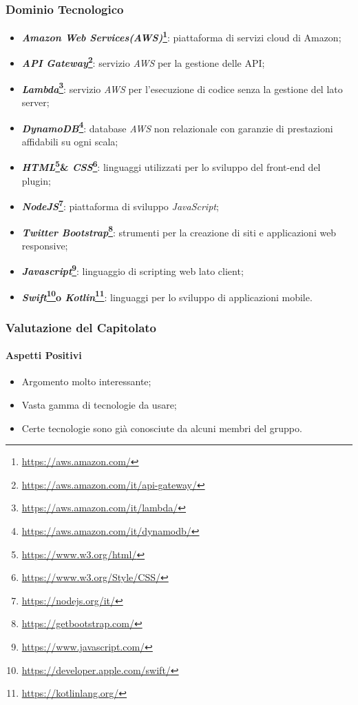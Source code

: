 \subsubsection{Dominio Tecnologico}
\begin{itemize}
	\item \textbf{\textit{Amazon Web Services(AWS)}\footnote{\url{https://aws.amazon.com/}}\glossario}: piattaforma di servizi cloud di Amazon;
	\item \textbf{\textit{API Gateway}\footnote{\url{https://aws.amazon.com/it/api-gateway/}}\glossario}: servizio \textit{AWS} per la gestione delle API;
	\item \textbf{\textit{Lambda}\footnote{\url{https://aws.amazon.com/it/lambda/}}\glossario}: servizio \textit{AWS} per l’esecuzione di codice senza la gestione del lato server;
	\item \textbf{\textit{DynamoDB}\footnote{\url{https://aws.amazon.com/it/dynamodb/}}\glossario}: database \textit{AWS} non relazionale con garanzie di prestazioni affidabili su ogni scala;
	\item \textbf{\textit{HTML}\footnote{\url{https://www.w3.org/html/}}\glossario \& \textit{CSS}\footnote{\url{https://www.w3.org/Style/CSS/}}\glossario}: linguaggi utilizzati per lo sviluppo del front-end del plugin;
	\item \textbf{\textit{NodeJS}\footnote{\url{https://nodejs.org/it/}}\glossario}: piattaforma di sviluppo \textit{JavaScript};
	\item \textbf{\textit{Twitter Bootstrap}\footnote{\url{https://getbootstrap.com/}}\glossario}: strumenti per la creazione di siti e applicazioni web responsive;
	\item \textbf{\textit{Javascript}\footnote{\url{https://www.javascript.com/}}}: linguaggio di scripting web lato client;
	\item \textbf{\textit{Swift}\footnote{\url{https://developer.apple.com/swift/}}\glossario o \textit{Kotlin}\footnote{\url{https://kotlinlang.org/}}\glossario}: linguaggi per lo sviluppo di applicazioni mobile.
\end{itemize}

\subsubsection{Valutazione del Capitolato}
\paragraph{Aspetti Positivi}
\begin{itemize}
	\item Argomento molto interessante;
	\item Vasta gamma di tecnologie da usare;
	\item Certe tecnologie sono già conosciute da alcuni membri del gruppo.
\end{itemize}

